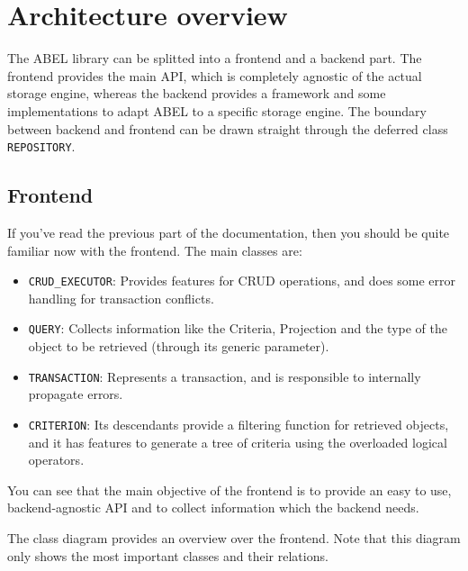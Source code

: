 \section{Architecture overview}

The ABEL library can be splitted into a frontend and a backend part.
The frontend provides the main API, which is completely agnostic of the actual storage engine, 
whereas the backend provides a framework and some implementations to adapt ABEL to a specific storage engine.
The boundary between backend and frontend can be drawn straight through the deferred class \lstinline!REPOSITORY!.

\subsection{Frontend}

If you've read the previous part of the documentation, then you should be quite familiar now with the frontend.
The main classes are:
 \begin{itemize}
  \item \lstinline!CRUD_EXECUTOR!: Provides features for CRUD operations, and does some error handling for transaction conflicts.
  \item \lstinline!QUERY!: Collects information like the Criteria, Projection and the type of the object to be retrieved (through its generic parameter).
  \item \lstinline!TRANSACTION!: Represents a transaction, and is responsible to internally propagate errors.
  \item \lstinline!CRITERION!: Its descendants provide a filtering function for retrieved objects, and it has features to generate a tree of criteria using the overloaded logical operators.
 \end{itemize}

You can see that the main objective of the frontend is to provide an easy to use, backend-agnostic API and to collect information which the backend needs.

The class diagram provides an overview over the frontend.
Note that this diagram only shows the most important classes and their relations.

